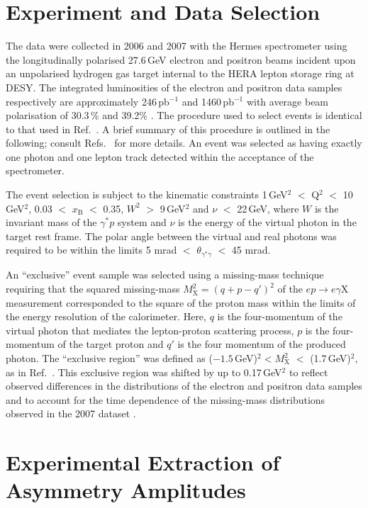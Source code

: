 \section{Experiment and Data Selection}
The data were collected in 2006 and 2007 with the H{\sc ermes}
spectrometer \cite{Ackerstaff1998} using the longitudinally polarised 27.6\,GeV
electron and positron beams incident upon an unpolarised hydrogen gas
target internal to the HERA lepton storage ring at DESY. The integrated
luminosities of the electron and positron data samples respectively are
approximately 246\,pb$^{-1}$ and 1460\,pb$^{-1}$\blue{,} with average beam polarisation of 30.3\,\% and 39.2\% \cite{2001}. The procedure used to select events is identical to that used in Ref.~\cite{2009a}.
A brief summary of this procedure is outlined in the following; consult
Refs.~\cite{Burnsth2010,Zeiler2009} for more details. An event
was selected as having exactly one photon and one lepton
track detected within the acceptance of the spectrometer.

The event selection is subject to the kinematic constraints 1\,GeV$^{2}$ $<$
Q$^{2}$ $<$ 10\,GeV$^{2}$, 0.03 $<$ $x_{\textrm{B}}$ $<$ 0.35, $W^{2}$ $>$
9\,GeV$^{2}$ and $\nu$ $<$ 22\,GeV, where $W$ is the invariant mass of the
$\gamma^{*}p$ system and $\nu$ is the energy of the virtual photon in the target
rest frame. The polar angle between the virtual and real photons was required to
be within the limits 5 mrad $<$
$\theta_{\gamma^{*}\gamma}$ $<$ 45 mrad. 

An ``exclusive'' event sample was selected using a missing-mass technique requiring that the squared missing-mass $M_{\textrm{X}}^{2}=(q+p-q')^{2}$ of the $ep \rightarrow e\gamma \textrm{X}$ measurement corresponded to the square of the proton mass within the limits of the energy resolution of the calorimeter. Here, $q$ is the four-momentum of the virtual photon that mediates the lepton-proton scattering process, $p$ is the four-momentum of the target proton and $q'$ is the four momentum of the produced photon. The ``exclusive region'' was defined as ($-1.5$\,GeV)$^{2} < M_{\textrm{X}}^{2}$ $<$ (1.7\,GeV)$^{2}$, as in Ref.~\cite{2009a}. This exclusive region was shifted by up to 0.17\,GeV$^{2}$ to reflect observed differences in the distributions of the electron and positron data samples and to account for the time dependence of the missing-mass distributions observed in the 2007 dataset \cite{Burnsth2010}. 

\section{Experimental Extraction of Asymmetry Amplitudes}

